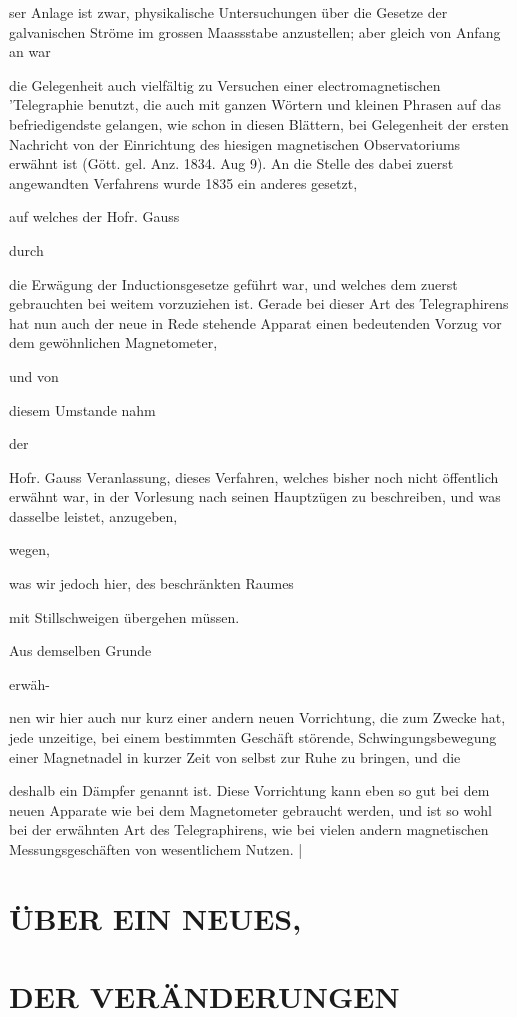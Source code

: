 \documentclass[12pt,a4paper]{article}
\begin{document}
ser Anlage ist zwar, physikalische Untersuchungen über die Gesetze der galvanischen Ströme im grossen Maassstabe anzustellen; aber gleich von Anfang an war

die Gelegenheit auch vielfältig zu Versuchen einer electromagnetischen 'Telegraphie benutzt, die auch mit ganzen Wörtern und kleinen Phrasen auf das befriedigendste gelangen, wie schon in diesen Blättern, bei Gelegenheit der ersten Nachricht von der Einrichtung des hiesigen magnetischen Observatoriums erwähnt ist (Gött. gel. Anz. 1834. Aug 9). An die Stelle des dabei zuerst angewandten Verfahrens wurde 1835 ein anderes gesetzt,

auf welches der Hofr. Gauss

durch

die Erwägung der Inductionsgesetze geführt war, und welches dem zuerst gebrauchten bei weitem vorzuziehen ist. Gerade bei dieser Art des Telegraphirens hat nun auch der neue in Rede stehende Apparat einen bedeutenden Vorzug vor dem gewöhnlichen Magnetometer,

und von

diesem Umstande nahm

der

Hofr. Gauss Veranlassung, dieses Verfahren, welches bisher noch nicht öffentlich erwähnt war, in der Vorlesung nach seinen Hauptzügen zu beschreiben, und was dasselbe leistet, anzugeben,

wegen,

was wir jedoch hier, des beschränkten Raumes

mit Stillschweigen übergehen müssen.

Aus demselben Grunde

erwäh-

nen wir hier auch nur kurz einer andern neuen Vorrichtung, die zum Zwecke hat, jede unzeitige, bei einem bestimmten Geschäft störende, Schwingungsbewegung einer Magnetnadel in kurzer Zeit von selbst zur Ruhe zu bringen, und die

deshalb ein Dämpfer genannt ist. Diese Vorrichtung kann eben so gut bei dem neuen Apparate wie bei dem Magnetometer gebraucht werden, und ist so wohl bei der erwähnten Art des Telegraphirens, wie bei vielen andern magnetischen Messungsgeschäften von wesentlichem Nutzen. |

\section*{ÜBER EIN NEUES,}
\section*{DER VERÄNDERUNGEN}
\end{document}
